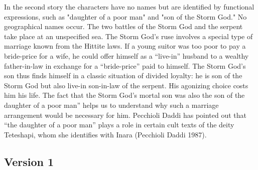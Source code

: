 \documentclass[10pt]{article}
\renewcommand{\.}[1]{\textsubdot{#1}}
\begin{document}
\begin{description}
In the second story the characters have no names but are identified by functional expressions, such as "daughter of a poor man" and "son of the Storm God." No geographical names occur. The two battles of the Storm God and the serpent take place at an unspecified sea. The Storm God's ruse involves a special type of marriage known from the Hittite laws. If a young suitor was too poor to pay a bride-price for a wife, he could offer himself as a ``live-in'' husband to a wealthy father-in-law in exchange for a ``bride-price'' paid to himself. The Storm God's son thus finds himself in a classic situation of divided loyalty: he is son of the Storm God but also live-in son-in-law of the serpent. His agonizing choice costs him his life. The fact that the Storm God's mortal son was also the son of the daughter of a poor man'' helps us to understand why such a marriage arrangement would be necessary for him. Pecchioli Daddi has pointed out that ``the daughter of a poor man'' plays a role in certain cult texts of the deity Teteshapi, whom she identifies with Inara (Pecchioli Daddi 1987).


\end{description}

\subsection{Version 1}
\end{document}
